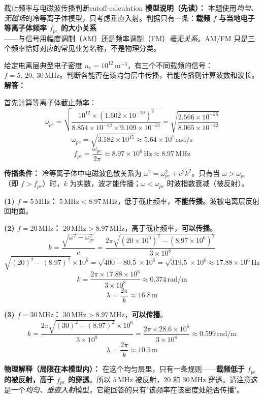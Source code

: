 \begin{example}{截止频率与电磁波传播判断}{cutoff-calculation}
\textbf{模型说明（先读）：} 本题使用\emph{均匀、无磁场}的冷等离子体模型，只考虑垂直入射。判据只有一条：\textbf{载频 $f$ 与当地电子等离子体频率 $f_{pe}$ 的大小关系}——与信号用幅度调制（AM）还是频率调制（FM）\emph{毫无关系}。AM/FM 只是三个频率恰好对应的常见业务名称，不是物理分类。

给定电离层典型电子密度 $n_e=10^{12}\,\mathrm{m}^{-3}$，有三个不同载频的信号：$f=5,\,20,\,30\,\mathrm{MHz}$。判断各能否在该均匀层中传播，若能传播则计算波数和波长。
\tcblower
\textbf{解答：}

首先计算等离子体截止频率：
\[
\omega_{pe} = \sqrt{\frac{10^{12}\times (1.602\times 10^{-19})^2}{8.854\times 10^{-12}\times 9.109\times 10^{-31}}} = \sqrt{\frac{2.566\times 10^{-26}}{8.065\times 10^{-42}}}
\]
\[
\omega_{pe} = \sqrt{3.182\times 10^{15}} \approx 5.64\times 10^7\,\mathrm{rad/s}
\]
\[
f_{pe} = \frac{\omega_{pe}}{2\pi} \approx 8.97\times 10^6\,\mathrm{Hz} \approx 8.97\,\mathrm{MHz}
\]

\textbf{传播条件：} 冷等离子体中电磁波色散关系为 $\omega^2 = \omega_{pe}^2 + c^2k^2$。只有当 $\omega > \omega_{pe}$（即 $f > f_{pe}$）时，$k$ 为实数，波才能传播；$\omega < \omega_{pe}$ 时波指数衰减（被反射）。

\textbf{(1) $f=5\,\mathrm{MHz}$：}
$5\,\mathrm{MHz} < 8.97\,\mathrm{MHz}$，低于截止频率，\textbf{不能传播}。波被电离层反射回地面。

\textbf{(2) $f=20\,\mathrm{MHz}$：}
$20\,\mathrm{MHz} > 8.97\,\mathrm{MHz}$，高于截止频率，\textbf{可以传播}。
\[
k = \frac{\sqrt{\omega^2 - \omega_{pe}^2}}{c} = \frac{2\pi\sqrt{(20\times 10^6)^2 - (8.97\times 10^6)^2}}{3\times 10^8}
\]
\[
\sqrt{(20)^2 - (8.97)^2}\times 10^6 = \sqrt{400 - 80.5}\times 10^6 = \sqrt{319.5}\times 10^6 \approx 17.88\times 10^6\,\mathrm{Hz}
\]
\[
k = \frac{2\pi\times 17.88\times 10^6}{3\times 10^8} \approx 0.374\,\mathrm{rad/m}
\]
\[
\lambda = \frac{2\pi}{k} \approx 16.8\,\mathrm{m}
\]

\textbf{(3) $f=30\,\mathrm{MHz}$：}
$30\,\mathrm{MHz} > 8.97\,\mathrm{MHz}$，\textbf{可以传播}。
\[
k = \frac{2\pi\sqrt{(30)^2 - (8.97)^2}\times 10^6}{3\times 10^8} = \frac{2\pi\times 28.6\times 10^6}{3\times 10^8} \approx 0.599\,\mathrm{rad/m}
\]
\[
\lambda = \frac{2\pi}{k} \approx 10.5\,\mathrm{m}
\]

\textbf{物理解释（局限在本模型内）：} 在这个均匀层里，只有一条规则——\textbf{载频低于 $f_{pe}$ 的被反射，高于 $f_{pe}$ 的穿透}。所以 $5\,\mathrm{MHz}$ 被反射，$20$ 和 $30\,\mathrm{MHz}$ 穿透。请注意这是一个\emph{均匀、垂直入射}模型，它能回答的只有"该频率在该密度处能否传播"。


\end{example}
